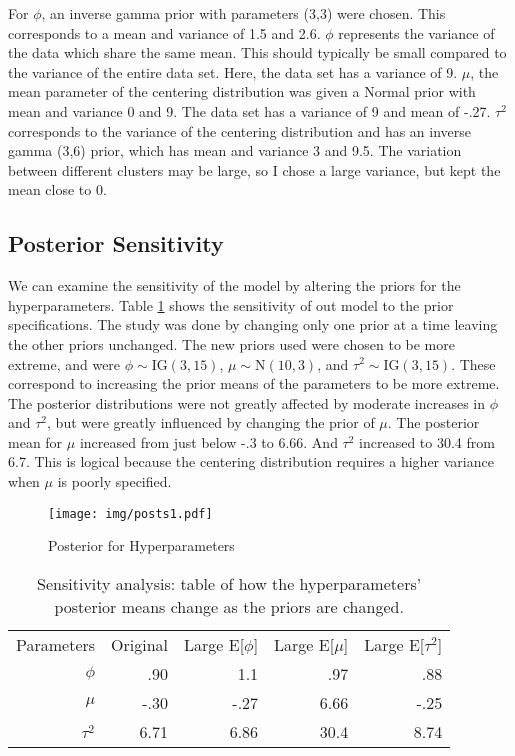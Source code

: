 \documentclass{article}
\def\beginmyfig{\begin{figure}[h]\center}
\def\endmyfig{\end{figure}}
\begin{document}
\noindent
For $\phi$, an inverse gamma prior with parameters (3,3) were chosen. This
corresponds to a mean and variance of 1.5 and 2.6. $\phi$ represents the
variance of the data which share the same mean. This should typically be small
compared to the variance of the entire data set. Here, the data set has a
variance of 9. $\mu$, the mean parameter of the centering distribution was
given a Normal prior with mean and variance 0 and 9.  The data set has a
variance of 9 and mean of -.27.  $\tau^2$ corresponds to the variance of the
centering distribution and has an inverse gamma (3,6) prior, which has
mean and variance 3 and 9.5. The variation between different clusters
may be large, so I chose a large variance, but kept the mean close to 0.\\


\subsection{Posterior Sensitivity}
We can examine the sensitivity of the model by altering the priors for the
hyperparameters. Table \ref{tab:posts1} shows the sensitivity of out model to
the prior specifications. The study was done by changing only one prior at a
time leaving the other priors unchanged. The new priors used were chosen to be
more extreme, and were $\phi \sim \text{IG}(3,15)$, $\mu \sim \text{N}(10,3)$,
and $\tau^2 \sim \text{IG}(3,15)$. These correspond to increasing the prior
means of the parameters to be more extreme. The posterior distributions were
not greatly affected by moderate increases in $\phi$ and $\tau^2$, but were
greatly influenced by changing the prior of $\mu$. The posterior mean for $\mu$
increased from just below -.3 to 6.66. And $\tau^2$ increased to 30.4 from 6.7.
This is logical because the centering distribution requires a higher variance 
when $\mu$ is poorly specified.

\beginmyfig
  \texttt{[image: img/posts1.pdf]}
  \caption{Posterior for Hyperparameters}
  \label{fig:post1}
\endmyfig

\begin{table}[h]
  \center
  \begin{tabular}{r|rrrr}
    Parameters & Original & Large E[$\phi$]& Large E[$\mu$] & Large E[$\tau^2$] \\
    $\phi$   &  .90 & 1.1  &   .97 &  .88 \\
    $\mu$    & -.30 & -.27 &  6.66 & -.25 \\
    $\tau^2$ & 6.71 & 6.86 & 30.4  & 8.74 \\
  \end{tabular}
  \caption{Sensitivity analysis: table of how the hyperparameters' posterior
  means change as the priors are changed.}
  \label{tab:posts1}
\end{table}
\end{document}
